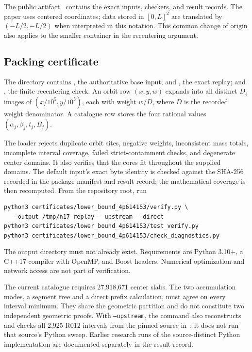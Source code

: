 \documentclass[11pt]{article}
\begin{document}
The public artifact~\cite{MiraRepo} contains the exact inputs, checkers, and
result records. The paper uses centered coordinates; data stored in
$[0,L]^2$ are translated by $(-L/2,-L/2)$ when interpreted in this notation.
This common change of origin also applies to the smaller container in the
recentering argument.

\subsection{Packing certificate}

The directory  contains
, the authoritative base input;  and
, the exact replay; and , the finite
recentering check. An orbit row $(x,y,w)$ expands into all distinct $D_4$
images of $(x/10^5,y/10^5)$, each with weight $w/D$, where $D$ is the recorded
weight denominator. A catalogue row stores the four rational values
$(\alpha_j,\beta_j,t_j,B_j)$.

The loader rejects duplicate orbit sites, negative weights, inconsistent
mass totals, incomplete interval coverage, failed strict-containment checks,
and degenerate center domains. It also verifies that the cores fit throughout
the supplied domains. The default input's exact byte identity is checked
against the SHA-256 recorded in the package manifest and result record; the
mathematical coverage is then recomputed. From the repository root, run
\begin{verbatim}
python3 certificates/lower_bound_4p614153/verify.py \
  --output /tmp/n17-replay --upstream --direct
python3 certificates/lower_bound_4p614153/test_verify.py
python3 certificates/lower_bound_4p614153/check_diagnostics.py
\end{verbatim}
The output directory must not already exist. Requirements are Python 3.10+,
a C++17 compiler with OpenMP, and Boost headers. Numerical optimization and
network access are not part of verification.

The current catalogue requires 27,918,671 center slabs. The two accumulation
modes, a segment tree and a direct prefix calculation, must agree on every
interval minimum. They share the geometric partition and do not constitute
two independent geometric proofs. With \texttt{--upstream}, the command also
reconstructs and checks all 2,925 R012 intervals from the pinned source
in~\cite{Guzhou}; it does not run that source's Python sweep. Earlier research
runs of the source-distinct Python implementation are documented separately
in the result record.
\end{document}
